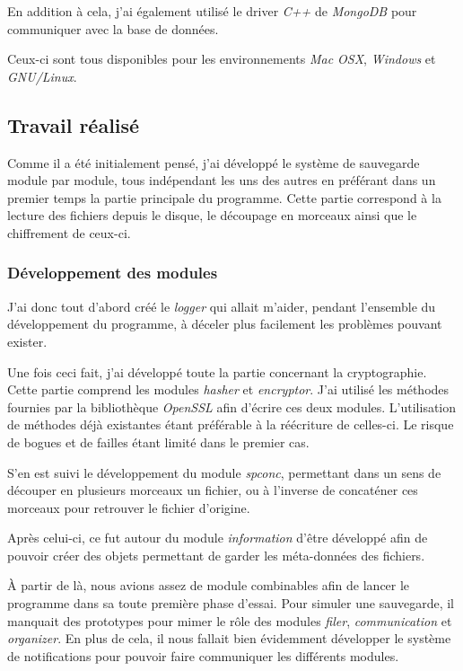 \documentclass[a4paper,10pt, twoside]{report}
\begin{document}
\begin{spacing}{1.2}
En addition à cela, j'ai également utilisé le driver \textit{C++} de
\textit{MongoDB} pour communiquer avec la base de données.

Ceux-ci sont tous disponibles pour les environnements \textit{Mac OSX},
\textit{Windows} et \textit{GNU/Linux}.

\subsection{Travail réalisé}
Comme il a été initialement pensé, j'ai développé le système de
sauvegarde module par module, tous indépendant les uns des autres en
préférant dans un premier temps la partie principale du programme. Cette
partie correspond à la lecture des fichiers depuis le disque, le découpage
en morceaux ainsi que le chiffrement de ceux-ci.

\subsubsection{Développement des modules}
J'ai donc tout d'abord créé le \textit{logger} qui allait m'aider, pendant
l'ensemble du développement du programme, à déceler plus facilement les
problèmes pouvant exister.

Une fois ceci fait, j'ai développé toute la partie concernant la
cryptographie. Cette partie comprend les modules \textit{hasher} et
\textit{encryptor}. J'ai utilisé les méthodes fournies par la bibliothèque
\textit{OpenSSL} afin d'écrire ces deux modules. L'utilisation de méthodes
déjà existantes étant préférable à la réécriture de celles-ci.
Le risque de bogues et de failles étant limité dans le premier cas.

S'en est suivi le développement du module \textit{spconc}, permettant dans un
sens de découper en plusieurs morceaux un fichier, ou à l'inverse de
concaténer ces morceaux pour retrouver le fichier d'origine.

Après celui-ci, ce fut autour du module \textit{information} d'être
développé afin de pouvoir créer des objets permettant de garder les
méta-données des fichiers.

À partir de là, nous avions assez de module combinables afin de lancer le
programme dans sa toute première phase d'essai. Pour simuler une sauvegarde,
il manquait des prototypes pour mimer le rôle des modules \textit{filer},
\textit{communication} et \textit{organizer}. En plus de cela, il nous fallait
bien évidemment développer le système de notifications pour pouvoir faire
communiquer les différents modules.


\end{spacing}
\end{document}
